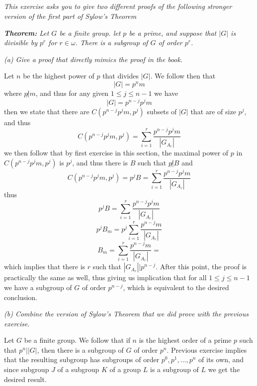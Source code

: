 \documentclass[11pt,oneside,titlepage]{book}
\begin{document}
\subsection{}

\textit{This exercise asks you to give two different proofs of the following
  stronger version of the first part of Sylow's Theorem}

\textit{\textbf{Theorem: } Let $G$ be a finite group. let $p$ be a
  prime, and suppose that $|G|$ is divisible by $p^r$ for $r \in
  \omega$.  There is a subgroup of $G$ of order $p^r$.}

\textit{(a) Give a proof that directly mimics the proof in the book.}

Let $n$ be the highest power of $p$ that divides $|G|$. We follow then
that
$$|G| = p^nm$$
where $p \not | m$, and thus for any given $1 \leq j \leq n - 1$ we have
$$|G| = p^{n - j}p^j{m}$$
then we state that there are $C(p^{n - j}p^j{m}, p^j)$ subsets of
$|G|$ that are of size $p^j$, and thus
$$C(p^{n - j}p^jm, p^j) = \sum_{i = 1}^{r}{\frac{p^{n - j}p^jm}{|G_{A_r}|}}$$
we then follow that by first exercise in this section, the maximal power
of $p$ in $C(p^{n - j}p^jm, p^j)$ is $p^j$, and thus there is $B$ such that
$p \not | B$ and 
$$C(p^{n - j}p^jm, p^j) = p^j B = \sum_{i = 1}^{r}{\frac{p^{n - j}p^jm}{|G_{A_r}|}}$$
thus
$$p^j B = \sum_{i = 1}^{r}{\frac{p^{n - j}p^jm}{|G_{A_r}|}}$$
$$p^j B_m = p^j \sum_{i = 1}^{r}{\frac{p^{n - j}m}{|G_{A_r}|}}$$
$$B_m = \sum_{i = 1}^{r}{\frac{p^{n - j}m}{|G_{A_r}|}} = $$
which implies that there is $r$ such that $|G_{A_r}| | p^{n - j}$.
After this point, the proof is practically the same as well, thus giving
us implication that for all $1 \leq j \leq n - 1$ we have a subgroup of $G$
of order $p^{n - j}$, which is equivalent to the desired conclusion.

\textit{(b) Combine the version of Sylow's Theorem that we did prove
  with the previous exercise}.

Let $G$ be a finite group. We follow that if $n$ is the highest order
of a prime $p$ such that $p^n | |G|$, then there is a subgroup of $G$
of order $p^n$. Previous exercise implies that the resulting subgroup
has subgroups of order $p^0, p^1, ..., p^n$ of its own, and since
subgroup $J$ of a subgroup $K$ of a group $L$ is a subgroup of $L$ we
get the desired result.

\subsection{}
\end{document}
